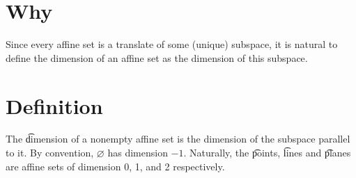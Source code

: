

\section*{Why}

Since every affine set is a translate of some (unique) subspace, it is natural to define the dimension of an affine set as the dimension of this subspace.

\section*{Definition}

The \t{dimension} of a nonempty affine set is the dimension of the subspace parallel to it.
By convention, $\varnothing$ has dimension $-1$.
Naturally, the \t{points}, \t{lines} and \t{planes} are affine sets of dimension 0, 1, and 2 respectively.

\blankpage